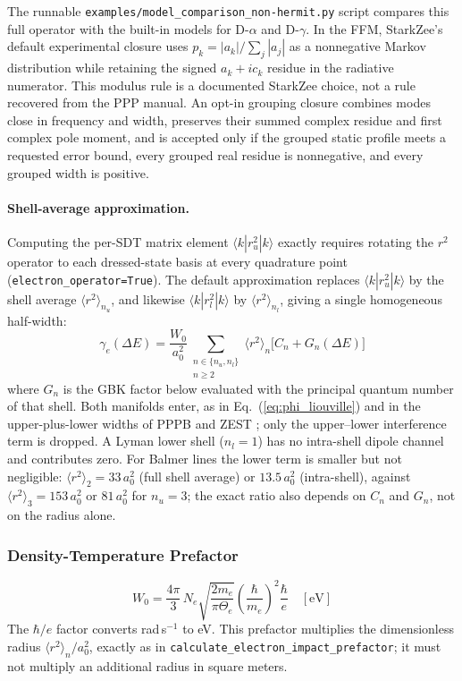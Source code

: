 \documentclass[11pt,a4paper]{article}
\numberwithin{equation}{section}
\begin{document}
The runnable \texttt{examples/model\_comparison\_non-hermit.py} script compares this full operator with the built-in models for D-$\alpha$ and D-$\gamma$. In the FFM, StarkZee's default experimental closure uses $p_k=|a_k|/\sum_j|a_j|$ as a nonnegative Markov distribution while retaining the signed $a_k+i c_k$ residue in the radiative numerator. This modulus rule is a documented StarkZee choice, not a rule recovered from the PPP manual. An opt-in grouping closure combines modes close in frequency and width, preserves their summed complex residue and first complex pole moment, and is accepted only if the grouped static profile meets a requested error bound, every grouped real residue is nonnegative, and every grouped width is positive.

\paragraph{Shell-average approximation.}
Computing the per-SDT matrix element $\langle k | r_u^2 | k \rangle$ exactly requires rotating the $r^2$ operator to each dressed-state basis at every quadrature point (\texttt{electron\_operator=True}).  The default approximation replaces $\langle k | r_u^2 | k \rangle$ by the shell average $\langle r^2 \rangle_{n_u}$, and likewise $\langle k | r_l^2 | k \rangle$ by $\langle r^2 \rangle_{n_l}$, giving a single homogeneous half-width:
\begin{equation}
\gamma_e(\Delta E) = \frac{W_0}{a_0^2}
\sum_{\substack{n\in\{n_u,n_l\}\\n\ge2}}
\langle r^2 \rangle_n \bigl[ C_n + G_n(\Delta E) \bigr]
\end{equation}
where $G_n$ is the GBK factor below evaluated with the principal quantum number of that shell. Both manifolds enter, as in Eq.~(\ref{eq:phi_liouville}) and in the upper-plus-lower widths of PPPB \cite{ferri} and ZEST \cite{Gilleron2018}; only the upper--lower interference term is dropped. A Lyman lower shell ($n_l=1$) has no intra-shell dipole channel and contributes zero. For Balmer lines the lower term is smaller but not negligible: $\langle r^2\rangle_2 = 33\,a_0^2$ (full shell average) or $13.5\,a_0^2$ (intra-shell), against $\langle r^2\rangle_3 = 153\,a_0^2$ or $81\,a_0^2$ for $n_u=3$; the exact ratio also depends on $C_n$ and $G_n$, not on the radius alone.

\subsubsection{Density-Temperature Prefactor}
\begin{equation}
W_0 = \frac{4\pi}{3}\,N_e\sqrt{\frac{2m_e}{\pi \Theta_e}}
      \left(\frac{\hbar}{m_e}\right)^{\!2}\frac{\hbar}{e}
\quad [\mathrm{eV}]
\end{equation}
The $\hbar/e$ factor converts rad\,s$^{-1}$ to eV. This prefactor multiplies
the dimensionless radius $\langle r^2\rangle_n/a_0^2$, exactly as in
\texttt{calculate\_electron\_impact\_prefactor}; it must not multiply an
additional radius in square meters.
\end{document}
